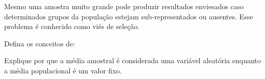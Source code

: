 \documentclass[a4paper,12pt,addpoints]{exam}
\begin{document}
\begin{questions}
\begin{solution}
			
			Mesmo uma amostra muito grande pode produzir resultados enviesados caso determinados grupos da população estejam sub-representados ou ausentes. Esse problema é conhecido como viés de seleção.
		\end{solution}
		
		\question[1]
		
		Defina os conceitos de:
		
		
		Explique por que a média amostral é considerada uma variável aleatória enquanto a média populacional é um valor fixo.
		
		\begin{solution}
			

\end{solution}
\end{questions}
\end{document}
